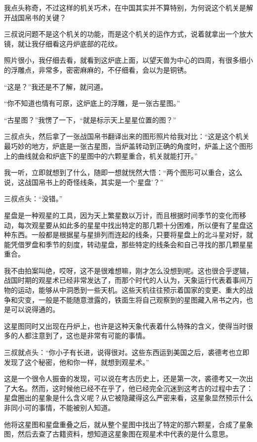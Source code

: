 我点头称奇，不过这样的机关巧术，在中国其实并不算特别，为何说这个机关是解开战国帛书的关键？

三叔说问题不是这个机关的功能，而是这个机关的运作方式，说着就拿出一个放大镜，就让我仔细看这丹炉底部的花纹。

照片很小，我仔细去看，就看到这炉底上面，以望天兽为中心的四周，有很多细小的浮雕点，非常多，密密麻麻的，不仔细看，会以为是铜锈。

“这是？”我还是不了解，就问道。

“你不知道也情有可原，这炉底上的浮雕，是一张古星图。”

“古星图？”我愣了一下，“就是标示天上星星位置的图？”

三叔点头，然后拿了一张战国帛书翻译出来的图形照片给我对比：“这是这个机关最巧妙的地方，炉底是一张古星图，当炉盖转动到正确的角度时，炉盖上这个图形上的曲线就会和炉底下的星图中的六颗星重合，机关就能打开。”

我一听，立即就想到了什么，随即一想就恍然大悟：“两个图形可以重合，这么说，这战国帛书上的奇怪线条，其实是一个‘星盘’？”

三叔点头：“没错。”

星盘是一种观星的工具，因为天上繁星数以万计，而且根据时间季节的变化而移动，每次观星要从如此多的星星中找出特定的那几颗十分困难，所以便有了星盘这种东西。一般都是根据星与星排列而连起的线条，只要将星盘上的北斗星对好，就能凭借罗盘和季节的刻度，转动星盘，那些特定的线条会和自己寻找的那几颗星星重合。

我不由拍案叫绝，哎呀，这不是很难想嘛，刚才怎么没想到呢。这也很合乎逻辑，战国时期的观星术已经非常发达了，而那个时代的人认为，天象运行代表着事间万物的运动，能够从中洞悉到一些天机。这些天机往往预示着国家的变更、重大的战争和灾变，一般是不能随意泄露的，铁面生将自己观察到的星图藏入帛书之内，也是可以说得通的。

这星图同时又出现在丹炉上，也许是这种天象代表着什么特殊的含义，使得当时很多的人都注意到了，这也是非常有可能的事情。

三叔就点头：“你小子有长进，说得很对。这些东西运到美国之后，裘德考也立即发现了这个秘密，他和你一样，就想到观星术。”

这是一个很令人振奋的发现，可以说在考古历史上，还是第一次，裘德考又一次出了大名。然而，这时候他已经不在乎了，他已经完全沉迷到这考古的过程中去了：星盘圈出的星象是什么含义呢？从它被隐藏得这么严密来看，这星象显然预示什么非同小可的事情，不能被别人知道。

他将这星图和星盘重叠之后，就从整个星图中找出了特定的那六颗星，合成了星象图，然后去查了古籍资料，想知道这星象图在观星术中代表的是什么意思。

